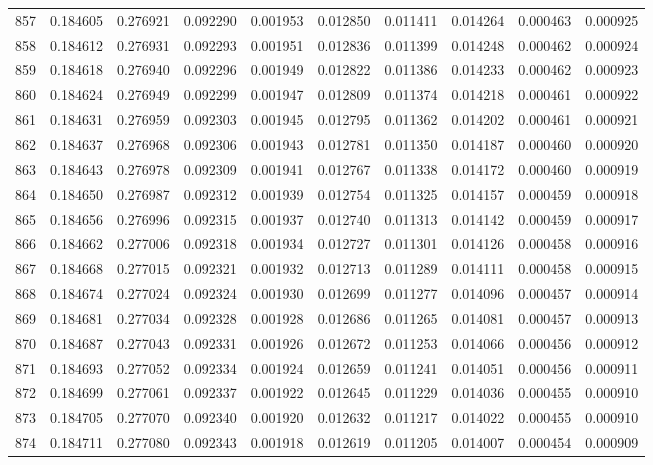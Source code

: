 \begin{tabular}{lrrrrrrrrr}
857 & 0.184605 & 0.276921 & 0.092290 & 0.001953 & 0.012850 & 0.011411 & 0.014264 & 0.000463 & 0.000925 \\
858 & 0.184612 & 0.276931 & 0.092293 & 0.001951 & 0.012836 & 0.011399 & 0.014248 & 0.000462 & 0.000924 \\
859 & 0.184618 & 0.276940 & 0.092296 & 0.001949 & 0.012822 & 0.011386 & 0.014233 & 0.000462 & 0.000923 \\
860 & 0.184624 & 0.276949 & 0.092299 & 0.001947 & 0.012809 & 0.011374 & 0.014218 & 0.000461 & 0.000922 \\
861 & 0.184631 & 0.276959 & 0.092303 & 0.001945 & 0.012795 & 0.011362 & 0.014202 & 0.000461 & 0.000921 \\
862 & 0.184637 & 0.276968 & 0.092306 & 0.001943 & 0.012781 & 0.011350 & 0.014187 & 0.000460 & 0.000920 \\
863 & 0.184643 & 0.276978 & 0.092309 & 0.001941 & 0.012767 & 0.011338 & 0.014172 & 0.000460 & 0.000919 \\
864 & 0.184650 & 0.276987 & 0.092312 & 0.001939 & 0.012754 & 0.011325 & 0.014157 & 0.000459 & 0.000918 \\
865 & 0.184656 & 0.276996 & 0.092315 & 0.001937 & 0.012740 & 0.011313 & 0.014142 & 0.000459 & 0.000917 \\
866 & 0.184662 & 0.277006 & 0.092318 & 0.001934 & 0.012727 & 0.011301 & 0.014126 & 0.000458 & 0.000916 \\
867 & 0.184668 & 0.277015 & 0.092321 & 0.001932 & 0.012713 & 0.011289 & 0.014111 & 0.000458 & 0.000915 \\
868 & 0.184674 & 0.277024 & 0.092324 & 0.001930 & 0.012699 & 0.011277 & 0.014096 & 0.000457 & 0.000914 \\
869 & 0.184681 & 0.277034 & 0.092328 & 0.001928 & 0.012686 & 0.011265 & 0.014081 & 0.000457 & 0.000913 \\
870 & 0.184687 & 0.277043 & 0.092331 & 0.001926 & 0.012672 & 0.011253 & 0.014066 & 0.000456 & 0.000912 \\
871 & 0.184693 & 0.277052 & 0.092334 & 0.001924 & 0.012659 & 0.011241 & 0.014051 & 0.000456 & 0.000911 \\
872 & 0.184699 & 0.277061 & 0.092337 & 0.001922 & 0.012645 & 0.011229 & 0.014036 & 0.000455 & 0.000910 \\
873 & 0.184705 & 0.277070 & 0.092340 & 0.001920 & 0.012632 & 0.011217 & 0.014022 & 0.000455 & 0.000910 \\
874 & 0.184711 & 0.277080 & 0.092343 & 0.001918 & 0.012619 & 0.011205 & 0.014007 & 0.000454 & 0.000909 \\

\end{tabular}
